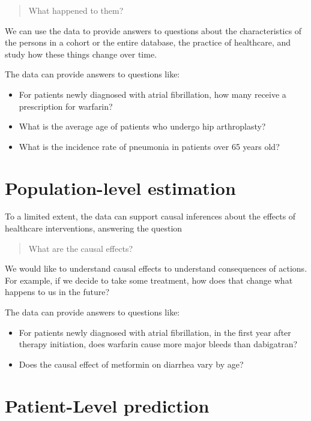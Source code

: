 \documentclass[11pt]{book}
\providecommand{\tightlist}{%
  \setlength{\itemsep}{0pt}\setlength{\parskip}{0pt}}
\begin{document}
\begin{quote}
What happened to them?
\end{quote}

We can use the data to provide answers to questions about the
characteristics of the persons in a cohort or the entire database, the
practice of healthcare, and study how these things change over time.

The data can provide answers to questions like:

\begin{itemize}
\tightlist
\item
  For patients newly diagnosed with atrial fibrillation, how many
  receive a prescription for warfarin?
\item
  What is the average age of patients who undergo hip arthroplasty?
\item
  What is the incidence rate of pneumonia in patients over 65 years old?
\end{itemize}

\section{Population-level estimation}\label{population-level-estimation}

To a limited extent, the data can support causal inferences about the
effects of healthcare interventions, answering the question

\begin{quote}
What are the causal effects?
\end{quote}

We would like to understand causal effects to understand consequences of
actions. For example, if we decide to take some treatment, how does that
change what happens to us in the future?

The data can provide answers to questions like:

\begin{itemize}
\tightlist
\item
  For patients newly diagnosed with atrial fibrillation, in the first
  year after therapy initiation, does warfarin cause more major bleeds
  than dabigatran?
\item
  Does the causal effect of metformin on diarrhea vary by age?
\end{itemize}

\section{Patient-Level prediction}\label{patient-level-prediction}
\end{document}
